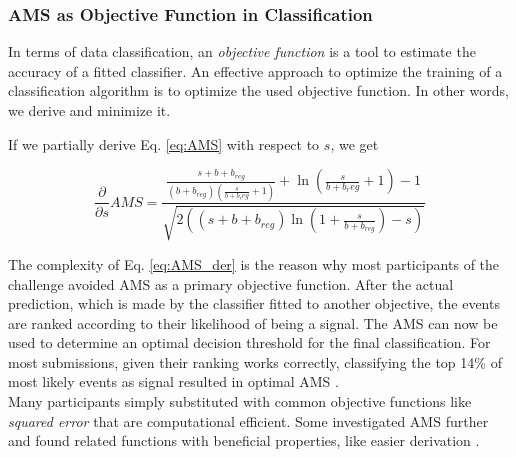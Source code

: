\subsubsection{AMS as Objective Function in Classification}
In terms of data classification, an \emph{objective function} is a tool to estimate the accuracy of a fitted classifier. An effective approach to optimize the training of a classification algorithm is to optimize the used objective function. In other words, we derive and minimize it.

If we partially derive Eq. \eqref{eq:AMS} with respect to $s$, we get

\begin{equation}\label{eq:AMS_der}
	\frac{\partial}{\partial s} AMS = 
	\frac{\frac{s + b + b_{reg}}
	{ ( b + b_{reg} ) \left( \frac{s}{b + b_reg} + 1 \right)}
	+ \ln \left( \frac{s}{b + b_reg} + 1 \right) - 1}
	{ \sqrt{2 \left( ( s + b + b_{reg} ) \ln{ \left( 1 +  \frac{s}{b+b_{reg}} \right)} - s \right)}}
\end{equation}

The complexity of Eq. \eqref{eq:AMS_der} is the reason why most participants of the challenge avoided AMS as a primary objective function. After the actual prediction, which is made by the classifier fitted to another objective, the events are ranked according to their likelihood of being a signal. The AMS can now be used to determine an optimal decision threshold for the final classification. For most submissions, given their ranking works correctly, classifying the top 14\% of most likely events as signal resulted in optimal AMS \cite{cowa14}. \\
Many participants simply substituted with common objective functions like \emph{squared error} that are computational efficient. Some investigated AMS further and found related functions with beneficial properties, like easier derivation \cite{kotl14,mack14,diaz14}.